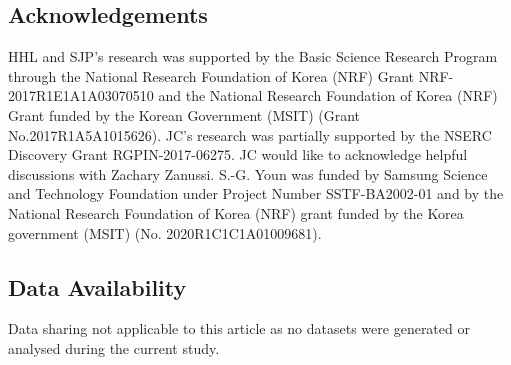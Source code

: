 \documentclass[12pt,reqno]{amsart}
\theoremstyle{definition}
\theoremstyle{definition}
\theoremstyle{definition}
\numberwithin{thm}{section}
\numberwithin{equation}{section}
\begin{document}
    





\subsection*{Acknowledgements} HHL and SJP's research was supported by the Basic Science Research Program through the National Research Foundation of Korea (NRF) Grant NRF-2017R1E1A1A03070510 and the National Research Foundation of Korea (NRF) Grant funded by the Korean Government (MSIT) (Grant No.2017R1A5A1015626). JC's research was partially supported by the NSERC Discovery Grant RGPIN-2017-06275. JC would like to acknowledge helpful discussions with Zachary Zanussi. S.-G. Youn was funded by Samsung Science and Technology Foundation under Project Number SSTF-BA2002-01 and
by the National Research Foundation of Korea (NRF) grant funded by the Korea government (MSIT) (No. 2020R1C1C1A01009681).

\subsection*{Data Availability}
Data sharing not applicable to this article as no datasets were generated or analysed during the current study.
\end{document}
